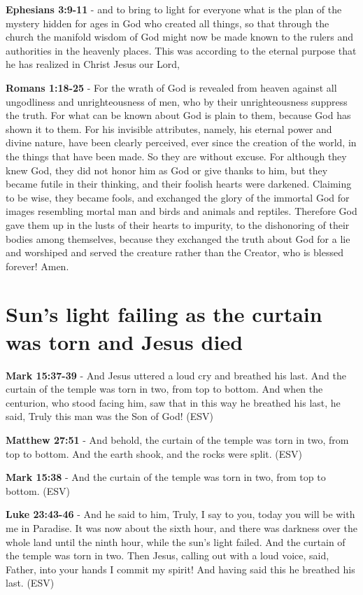 \documentclass[11pt]{article}
\begin{document}
\textbf{Ephesians 3:9-11} - and to bring to light for everyone what is the plan of the mystery hidden for ages in God who created all things, so that through the church the manifold wisdom of God might now be made known to the rulers and authorities in the heavenly places. This was according to the eternal purpose that he has realized in Christ Jesus our Lord,

\textbf{Romans 1:18-25} - For the wrath of God is revealed from heaven against all ungodliness and unrighteousness of men, who by their unrighteousness suppress the truth. For what can be known about God is plain to them, because God has shown it to them. For his invisible attributes, namely, his eternal power and divine nature, have been clearly perceived, ever since the creation of the world, in the things that have been made. So they are without excuse. For although they knew God, they did not honor him as God or give thanks to him, but they became futile in their thinking, and their foolish hearts were darkened. Claiming to be wise, they became fools, and exchanged the glory of the immortal God for images resembling mortal man and birds and animals and reptiles. Therefore God gave them up in the lusts of their hearts to impurity, to the dishonoring of their bodies among themselves, because they exchanged the truth about God for a lie and worshiped and served the creature rather than the Creator, who is blessed forever! Amen.

\section{Sun's light failing as the curtain was torn and Jesus died}
\label{sec:org165e512}
\textbf{Mark 15:37-39} - And Jesus uttered a loud cry and breathed his last. And the curtain of the temple was torn in two, from top to bottom. And when the centurion, who stood facing him, saw that in this way he breathed his last, he said, Truly this man was the Son of God! (ESV)

\textbf{Matthew 27:51} - And behold, the curtain of the temple was torn in two, from top to bottom. And the earth shook, and the rocks were split. (ESV)

\textbf{Mark 15:38} - And the curtain of the temple was torn in two, from top to bottom. (ESV)

\textbf{Luke 23:43-46} - And he said to him, Truly, I say to you, today you will be with me in Paradise. It was now about the sixth hour, and there was darkness over the whole land until the ninth hour, while the sun's light failed. And the curtain of the temple was torn in two. Then Jesus, calling out with a loud voice, said, Father, into your hands I commit my spirit! And having said this he breathed his last. (ESV)
\end{document}
